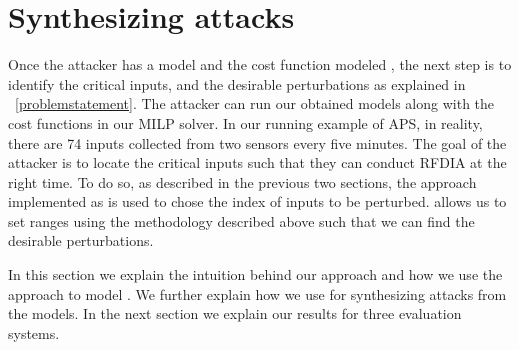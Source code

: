 \section{Synthesizing attacks}
Once the attacker has a model and the cost function modeled , the next step is to identify the critical inputs, and the desirable perturbations as explained in ~\ref{problemstatement}.
The attacker can run our obtained models along with the cost functions in our \ac{MILP} solver. 
In our running example of APS, in reality, there are 74 inputs collected from two sensors every five minutes.
 The goal of the attacker is to locate the critical inputs such that they can conduct \ac{RFDIA} at the right time.
 To do so, as described in the previous two sections, the approach implemented as \tool is used to chose the index of inputs to be perturbed.
 \tool allows us to set ranges using the methodology described above such that we can find the desirable perturbations. 
 

In this section we explain the intuition behind our approach and how we use the approach to model \tool. 
We further explain how we use \tool for synthesizing attacks from the models. 
In the next section we explain our results for three evaluation systems. 

